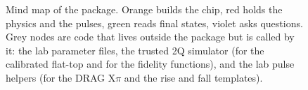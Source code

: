 \documentclass[11pt,a4paper]{article}
\begin{document}
\begin{figure}[p]
\caption{Mind map of the package. Orange builds the chip, red holds the physics and the pulses, green reads final
states, violet asks questions. Grey nodes are code that lives outside the package but is called by it: the lab
parameter files, the trusted 2Q simulator (for the calibrated flat-top and for the fidelity functions), and the lab
pulse helpers (for the DRAG X\(\pi\) and the rise and fall templates).}
\label{fig:mindmap}
\end{figure}
\end{document}
